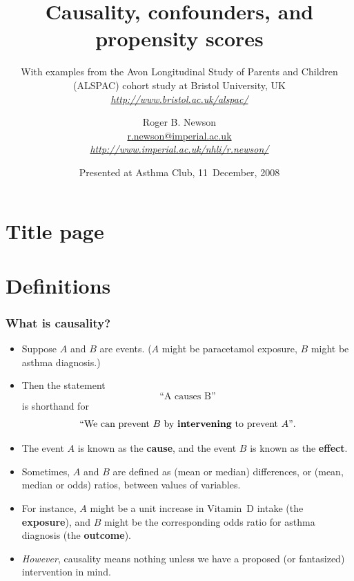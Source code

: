 \documentclass[11pt]{beamer}
\title[Causality, confounders, and propensity scores] %
{\textbf{Causality, confounders, and propensity scores}}
\subtitle
{\scriptsize With examples from the Avon Longitudinal Study of Parents and Children (ALSPAC) cohort study at Bristol University, UK
\\ \href{http://www.bristol.ac.uk/alspac/}{\textsl{http://www.bristol.ac.uk/alspac/}}
}
\author[Author, Another] %
{
Roger B. Newson
\\ \href{mailto:r.newson@imperial.ac.uk}{r.newson@imperial.ac.uk}
\\ \href{http://www.imperial.ac.uk/nhli/r.newson/}{\textsl{http://www.imperial.ac.uk/nhli/r.newson/}}
}
\institute[National Heart and Lung Institute, Imperial College London]
{
National Heart and Lung Institute\\
Imperial College London
}
\date[Asthma Club 2008] %
{
Presented at Asthma Club, 11~December, 2008
}
\begin{document}
\section{Title page}

\begin{frame}
  \titlepage
\end{frame}


\section{Definitions}

\begin{frame}
\frametitle{What is causality?}

\begin{itemize}

\item<2-> Suppose $A$ and $B$ are events. ($A$ might be paracetamol exposure, $B$ might be asthma diagnosis.)

\item<3-> Then the statement
$$
\mbox{``A causes B''}
$$
is shorthand for
$$
\mbox{``We can prevent $B$ by \textbf{intervening} to prevent $A$''}.
$$

\item<4-> The event $A$ is known as the \textbf{cause}, and the event $B$ is known as the \textbf{effect}.

\item<5-> Sometimes, $A$ and $B$ are defined as (mean or median) differences, or (mean, median or odds) ratios,
between values of variables.

\item<6-> For instance, $A$ might be a unit increase in Vitamin~D intake (the \textbf{exposure}),
and $B$ might be the corresponding odds ratio for asthma diagnosis (the \textbf{outcome}).

\item<7-> \textit{However}, causality means nothing unless we have a proposed (or fantasized) intervention in mind.

\end{itemize}

\end{frame}
\end{document}

